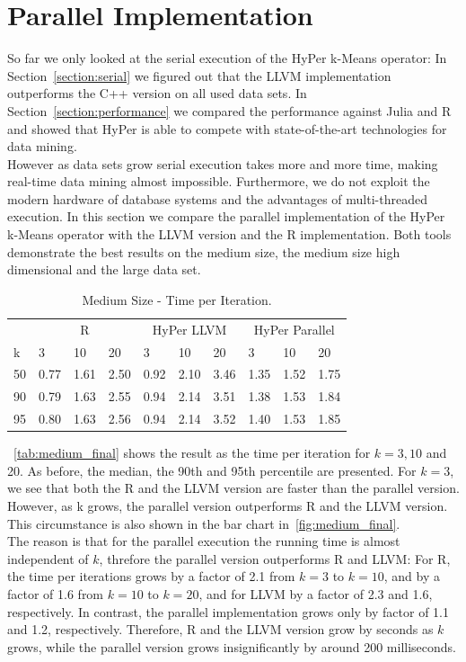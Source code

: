 \section{Parallel Implementation}


So far we only looked at the serial execution of the HyPer k-Means operator: In Section~\ref{section:serial}  we figured out that the LLVM implementation outperforms the C++ version on all used data sets. In Section~\ref{section:performance} we compared the performance against Julia and R and showed that HyPer is able to compete with state-of-the-art technologies for data mining.
\\
However as data sets grow serial execution takes more and more time, making real-time data mining almost impossible. Furthermore, we do not exploit the modern hardware of database systems and the advantages of multi-threaded execution. In this section we compare the parallel implementation of the HyPer k-Means operator with the LLVM version and the R implementation. Both tools demonstrate the best results on the medium size, the medium size high dimensional and the large data set. 

\begin{table}[htsb]
  \caption[Medium Size - Time per Iteration]{Medium Size - Time per Iteration.}
  \label{tab:medium_final}
  \centering
  \begin{tabular}{l l l l l l l l l l }
    \toprule
      & \multicolumn{3}{c}{R} & \multicolumn{3}{c}{HyPer LLVM} & \multicolumn{3}{c}{HyPer Parallel}  \\
      k & 3 & 10 & 20 & 3 & 10 & 20 & 3 & 10 & 20 \\
    \midrule
      50  & 0.77 & 1.61 & 2.50 & 0.92 & 2.10 & 3.46 & 1.35 & 1.52 & 1.75 \\
      90  & 0.79 & 1.63 & 2.55 & 0.94 & 2.14 & 3.51 & 1.38 & 1.53 & 1.84 \\
      95  & 0.80 & 1.63 & 2.56 & 0.94 & 2.14 & 3.52 & 1.40 & 1.53 & 1.85 \\
    \bottomrule
  \end{tabular}
\end{table}

~\autoref{tab:medium_final} shows the result as the time per iteration for $k = 3, 10$ and 20. As before, the median, the 90th and 95th percentile are presented. For $k = 3$, we see that both the R and the LLVM version are faster than the parallel version. However, as k grows, the parallel version outperforms R and the LLVM version. This circumstance is also shown in the bar chart in~\autoref{fig:medium_final}.
\\
The reason is that for the parallel execution the running time is almost independent of $k$, threfore the parallel version outperforms R and LLVM: For R, the time per iterations grows by a factor of 2.1 from $k = 3$ to $k = 10$, and by a factor of 1.6 from $k = 10$ to $k = 20$, and for LLVM by a factor of 2.3 and 1.6, respectively. In contrast, the parallel implementation grows only by factor of 1.1 and 1.2, respectively. Therefore, R and the LLVM version grow by seconds as $k$ grows, while the parallel version grows insignificantly by around 200 milliseconds. 

